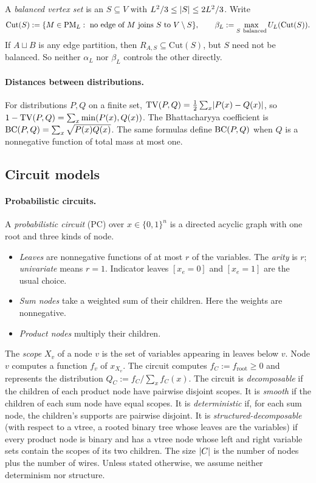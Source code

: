 A \emph{balanced vertex set} is an $S\subseteq V$ with $L^2/3\le\lvert S\rvert\le 2L^2/3$. Write
\[
  \mathrm{Cut}(S):=\{M\in\mathrm{PM}_L:\ \text{no edge of $M$ joins $S$ to $V\setminus S$}\},\qquad
  \beta_L:=\max_{S\ \text{balanced}} U_L(\mathrm{Cut}(S)).
\]
If $A\sqcup B$ is any edge partition, then $R_{A,S}\subseteq\mathrm{Cut}(S)$, but $S$ need not be balanced. So neither $\alpha_L$ nor $\beta_L$ controls the other directly.

\paragraph{Distances between distributions.} For distributions $P,Q$ on a finite set, $\mathrm{TV}(P,Q)=\frac12\sum_x\lvert P(x)-Q(x)\rvert$, so $1-\mathrm{TV}(P,Q)=\sum_x\min(P(x),Q(x))$. The Bhattacharyya coefficient is $\mathrm{BC}(P,Q)=\sum_x\sqrt{P(x)Q(x)}$. The same formulas define $\mathrm{BC}(P,Q)$ when $Q$ is a nonnegative function of total mass at most one.

\subsection{Circuit models}\label{sec:models}

\paragraph{Probabilistic circuits.} A \emph{probabilistic circuit} (PC) over $x\in\{0,1\}^n$ is a directed acyclic graph with one root and three kinds of node.
\begin{itemize}
\item \emph{Leaves} are nonnegative functions of at most $r$ of the variables. The \emph{arity} is $r$; \emph{univariate} means $r=1$. Indicator leaves $[x_e=0]$ and $[x_e=1]$ are the usual choice.
\item \emph{Sum nodes} take a weighted sum of their children. Here the weights are nonnegative.
\item \emph{Product nodes} multiply their children.
\end{itemize}
The \emph{scope} $X_v$ of a node $v$ is the set of variables appearing in leaves below $v$. Node $v$ computes a function $f_v$ of $x_{X_v}$. The circuit computes $f_C:=f_{\mathrm{root}}\ge0$ and represents the distribution $Q_C:=f_C/\sum_xf_C(x)$. The circuit is \emph{decomposable} if the children of each product node have pairwise disjoint scopes. It is \emph{smooth} if the children of each sum node have equal scopes. It is \emph{deterministic} if, for each sum node, the children's supports are pairwise disjoint. It is \emph{structured-decomposable} (with respect to a vtree, a rooted binary tree whose leaves are the variables) if every product node is binary and has a vtree node whose left and right variable sets contain the scopes of its two children. The size $\lvert C\rvert$ is the number of nodes plus the number of wires. Unless stated otherwise, we assume neither determinism nor structure.

